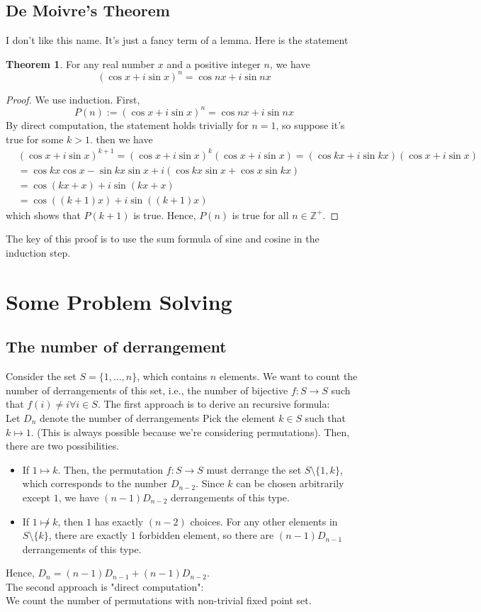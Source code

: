 \documentclass{article}
\theoremstyle{definition}
\theoremstyle{definition}
\theoremstyle{definition}
\theoremstyle{definition}
\theoremstyle{definition}
\theoremstyle{definition}
\theoremstyle{definition}
\theoremstyle{definition}
\theoremstyle{definition}
\newtheorem{theorem}{Theorem}[section]
\newcommand{\ZZ}{\mathbb{Z}}
\begin{document}
\subsection{De Moivre's Theorem}
I don't like this name. It's just a fancy term of a lemma. Here is the statement
\begin{theorem}
    For any real number $x$ and a positive integer $n$, we have \[(\cos x+i\sin x)^n=\cos nx+i\sin nx\]
\end{theorem}
\begin{proof}
    We use induction. First,
    \[
    P(n):= (\cos x+i\sin x)^n=\cos nx+i\sin nx 
    \]
    By direct computation, the statement holds trivially for $n=1$, so suppose it's true for some $k>1$.
    then we have
    \begin{align*}
        &(\cos x+i\sin x)^{k+1}=(\cos x+i\sin x)^k(\cos x+i\sin x)=(\cos kx+i\sin kx)(\cos x+i\sin x)\\
        &=\cos kx\cos x-\sin kx\sin x+i(\cos kx\sin x+\cos x\sin kx)\\
        &=\cos(kx+x)+i\sin(kx+x)\\
        &=\cos((k+1)x)+i\sin((k+1)x)
    \end{align*}
    which shows that $P(k+1)$ is true. Hence, $P(n)$ is true for all $n\in\ZZ^+$.
\end{proof}
The key of this proof is to use the sum formula of sine and cosine in the induction step.

\section{Some Problem Solving}
\subsection{The number of derrangement}
Consider the set $S=\{1,...,n\}$, which contains $n$ elements. We want to count the number of derrangements of this set, i.e., the number of bijective $f:S\to S$ such that $f(i)\neq i\forall i\in S$.
The first approach is to derive an recursive formula:\\
Let $D_n$ denote the number of derrangements
Pick the element $k\in S$ such that $k\mapsto 1$. (This is always possible because we're considering permutations). Then, there are two possibilities.
\begin{itemize}
    \item If $1\mapsto k$. Then, the permutation $f:S\to S$ must derrange the set $S\setminus\{1,k\}$, which corresponds to the number $D_{n-2}$. Since $k$ can be chosen arbitrarily except $1$, we have $(n-1)D_{n-2}$ derrangements of this type.
    \item If $1\not\mapsto k$, then $1$ has exactly $(n-2)$ choices. For any other elements in $S\setminus\{k\}$, there are exactly $1$ forbidden element, so there are $(n-1)D_{n-1}$ derrangements of this type.
\end{itemize}
Hence, $D_n=(n-1)D_{n-1}+(n-1)D_{n-2}$.\\
The second approach is "direct computation":\\
We count the number of permutations with non-trivial fixed point set. %
\end{document}
